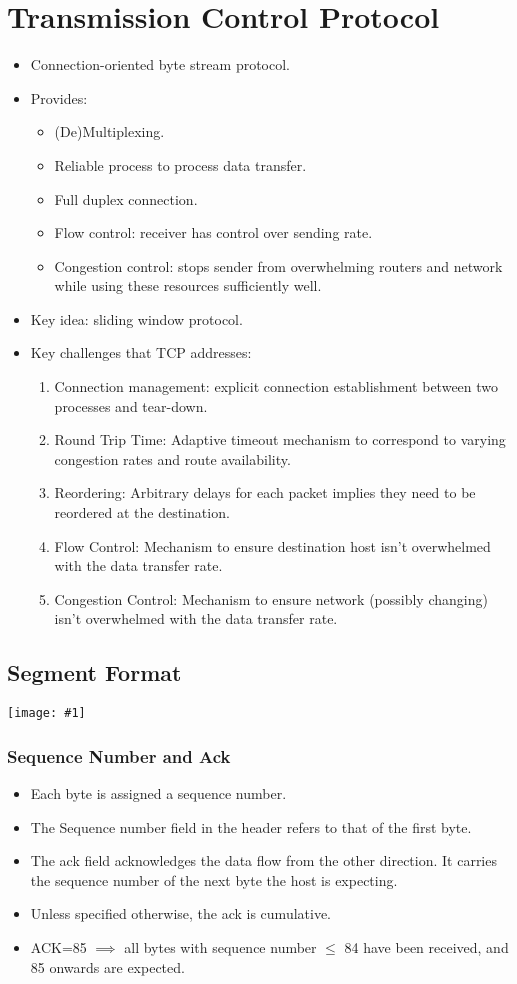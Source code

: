 \documentclass{report}
\makeatletter
\def\maxwidth#1{\ifdim\Gin@nat@width>#1 #1\else\Gin@nat@width\fi}
\newcommand{\mygraphic}[1]{
\begin{center}
    \texttt{[image: \#1]}
\end{center}
}
\makeatother
\begin{document}
\section{Transmission Control Protocol}
\label{sec:tcp}
\begin{itemize}
\item Connection-oriented byte stream protocol.
\item Provides:
\begin{itemize}
    \item (De)Multiplexing.
    \item Reliable process to process data transfer.
    \item Full duplex connection.
    \item Flow control: receiver has control over sending rate.
    \item Congestion control: stops sender from overwhelming routers and network while using these resources sufficiently well.
\end{itemize}
\item Key idea: sliding window protocol.
\item Key challenges that TCP addresses:
\begin{enumerate}
\item Connection management: explicit connection establishment between two processes and tear-down.
\item Round Trip Time: Adaptive timeout mechanism to correspond to varying congestion rates and route availability.
\item Reordering: Arbitrary delays for each packet implies they need to be reordered at the destination.
\item Flow Control: Mechanism to ensure destination host isn't overwhelmed with the data transfer rate.
\item Congestion Control: Mechanism to ensure network (possibly changing) isn't overwhelmed with the data transfer rate.
\end{enumerate}
\end{itemize}
\subsection{Segment Format}
\mygraphic{rsrc/tcppacket.png}
\subsubsection{Sequence Number and Ack}
\begin{itemize}
\item Each byte is assigned a sequence number.
\item The Sequence number field in the header refers to that of the first byte.
\item The ack field acknowledges the data flow from the other direction. It carries the sequence number of the next byte
the host is expecting.
\item Unless specified otherwise, the ack is cumulative. 
\item ACK=85 $\implies$ all bytes with sequence number $\leq$ 84 have been received, and 85 onwards are expected. 
\end{itemize}
\end{document}
